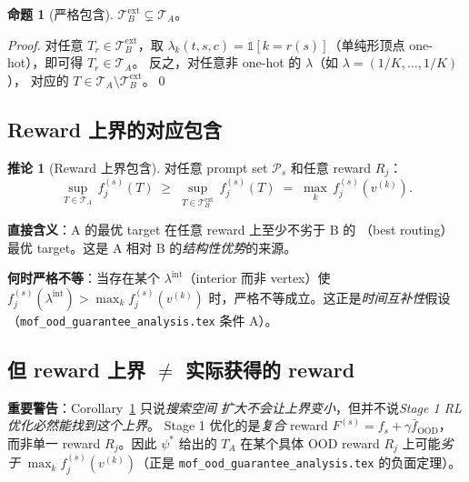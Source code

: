 \documentclass[11pt,a4paper]{article}
\newcommand{\OOD}{\mathrm{OOD}}
\theoremstyle{definition}
\newtheorem{proposition}{命题}
\newtheorem{corollary}{推论}
\begin{document}
\begin{proposition}[严格包含]
\label{prop:inclusion}
$\mathcal{T}_B^{\text{ext}} \subsetneq \mathcal{T}_A$。
\end{proposition}

\begin{proof}
对任意 $T_r \in \mathcal{T}_B^{\text{ext}}$，取 $\lambda_k(t, s, c) =
\mathbb{1}[k = r(s)]$（单纯形顶点 one-hot），即可得 $T_r \in \mathcal{T}_A$。
反之，对任意非 one-hot 的 $\lambda$（如 $\lambda = (1/K, \ldots, 1/K)$），
对应的 $T \in \mathcal{T}_A \setminus \mathcal{T}_B^{\text{ext}}$。\qed
\end{proof}

\subsection{Reward 上界的对应包含}

\begin{corollary}[Reward 上界包含]
\label{cor:reward_upper}
对任意 prompt set $\mathcal{P}_s$ 和任意 reward $R_j$：
\begin{equation}
\sup_{T \in \mathcal{T}_A}\,f_j^{(s)}(T) \;\geq\; \sup_{T \in \mathcal{T}_B^{\text{ext}}}\,f_j^{(s)}(T) \;=\; \max_{k}\,f_j^{(s)}(v^{(k)}).
\end{equation}
\end{corollary}

\textbf{直接含义}：A 的最优 target 在任意 reward 上至少不劣于 B 的
（best routing）最优 target。这是 A 相对 B 的\emph{结构性优势}的来源。

\textbf{何时严格不等}：当存在某个 $\lambda^{\text{int}}$（interior 而非
vertex）使 $f_j^{(s)}(\lambda^{\text{int}}) > \max_k f_j^{(s)}(v^{(k)})$
时，严格不等成立。这正是\emph{时间互补性}假设
（\texttt{mof\_ood\_guarantee\_analysis.tex} 条件 A）。

\subsection{但 reward 上界 $\neq$ 实际获得的 reward}

\textbf{重要警告}：Corollary~\ref{cor:reward_upper} 只说\emph{搜索空间
扩大不会让上界变小}，但并不说\emph{Stage 1 RL 优化必然能找到这个上界}。
Stage 1 优化的是\emph{复合} reward $F^{(s)} = f_s + \gamma \bar f_{\OOD}$，
而非单一 reward $R_j$。因此 $\psi^*$ 给出的 $T_A$ 在某个具体 OOD reward
$R_j$ 上可能\emph{劣于} $\max_k f_j^{(s)}(v^{(k)})$（正是
\texttt{mof\_ood\_guarantee\_analysis.tex} 的负面定理）。
\end{document}
